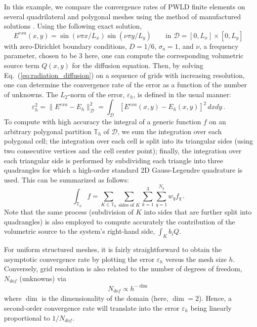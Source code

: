\documentclass[preprint,10pt]{elsarticle}
\newcommand{\D}{\mathcal{D}}
\newcommand{\eqt}[1]{Eq.~(\ref{#1})}                     %
\newcommand{\tf}{b}
\begin{document}
In this example, we compare the convergence rates of PWLD finite elements on several quadrilateral
and polygonal meshes using the method of manufactured solutions \cite{roache_2009}. Using the following exact solution,
\begin{equation} \label{eq:mms1}
	E^{\textit{exa}}(x,y) = \sin(\nu \pi x/L_x) \sin(\nu\pi y/L_y) \qquad \text{in } \D=[0,L_x]\times [0,L_y]
\end{equation}
with zero-Dirichlet boundary conditions, $D=1/6$, $\sigma_a=1$, and $\nu$, a frequency parameter, chosen to be 3 here, one can compute 
the corresponding volumetric source term $Q(x,y)$ for the diffusion equation. Then, by solving \eqt{eq:radiation_diffusion} 
on a sequence of
grids with increasing resolution, one can determine the convergence rate of the error
as a function of the number of unknowns. The $L_2$-norm of the error, $\varepsilon_h$, is defined in the usual manner:
\begin{equation}
	\varepsilon_h^2 = \| E^{\textit{exa}} - E_h \|^2_\D = \int_\D \left[ E^{\textit{exa}}(x,y)  - E_h(x,y) \right]^2 \, dxdy	\, .
\end{equation}
To compute with high accuracy the integral of a generic function $f$ on an arbitrary polygonal partition $\mathbb{T}_h$ of $\D$, 
we sum the integration over each polygonal cell; the integration over each cell is split into its triangular sides (using two 
consecutive vertices and the cell center point); finally, the integration over each triangular side is performed by 
subdividing each triangle into three quadrangles for which a high-order standard 2D Gauss-Legendre quadrature is used. 
This can be summarized as follows:
\begin{equation}
	\int_{\mathbb{T}_h} f  = \sum_{K\in \mathbb{T}_h} \sum_{\text{sides of }K} \sum_{k=1}^3 
	\sum_{q=1}^{N_q} w_q f_q
	\, .
\end{equation}
Note that the same process (subdivision of $K$ into sides that are further split into quadrangles) is also employed 
to compute accurately the contribution of the volumetric source to the system's right-hand side, $\int_K \tf_i Q$.

For uniform structured meshes, it is fairly straightforward to obtain the asymptotic convergence rate by plotting the error 
$\varepsilon_h$ versus the mesh size $h$. Conversely, grid resolution is also related to the number of degrees of freedom, 
$N_\textit{dof}$ (unknowns) via 
\begin{equation}
N_{\textit{dof}} \propto  h ^{-\dim} 
\end{equation}
where $\dim$ is the dimensionality of the domain (here, $\dim = 2$). Hence, a second-order convergence rate will 
translate into the error $\varepsilon_h$ being linearly proportional to $1/N_{\textit{dof}}$.
\end{document}
